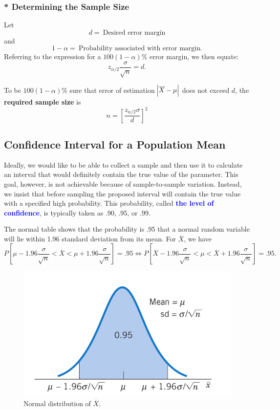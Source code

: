 \documentclass[12pt,a4paper]{article}
\begin{document}
\subsubsection*{* Determining the Sample Size}
Let \[
d =\ \text{Desired error margin}
\] and \[
1-\alpha =\ \text{Probability associated with error margin}.
\] Referring to the expression for a $100(1-\alpha)\%$ error margin, we then equate: \[
z_{\alpha/2}\frac{\sigma}{\sqrt{n}}=d.
\]
\begin{tcolorbox}[colback=white]
	To be $100(1-\alpha)\%$ sure that error of estimation $\abs{\overline{X}-\mu}$ does not exceed $d$, the \textbf{required sample size} is \[
	n=\left[\frac{z_{\alpha/2}\sigma}{d}\right]^2
	\]
\end{tcolorbox}

\subsection{Confidence Interval for a Population Mean}
Ideally, we would like to be able to collect a sample and then use it to calculate an interval that would definitely contain the true value of the parameter. This goal, however, is not achievable because of sample-to-sample variation. Instead, we insist that before sampling the proposed interval will contain the true
value with a specified high probability. This probability, called \textcolor{blue}{\bf the level of confidence}, is typically taken as .90, .95, or .99.\par
The normal table shows that the probability is .95 that a normal random variable will lie within 1.96 standard deviation from its mean. For $\overline{X}$, we have \[
P\left[\mu-1.96\frac{\sigma}{\sqrt{n}}<\overline{X}<\mu+1.96\frac{\sigma}{\sqrt{n}}\right] = .95
\iff P\left[\overline{X}-1.96\frac{\sigma}{\sqrt{n}}<\mu<\overline{X}+1.96\frac{\sigma}{\sqrt{n}}\right] = .95.
\]
\begin{figure}[h!]
	\centering
	\includegraphics[scale=0.3]{8-3.png}
	\caption{Normal distribution of $\overline{X}$.}
\end{figure}\
\end{document}
